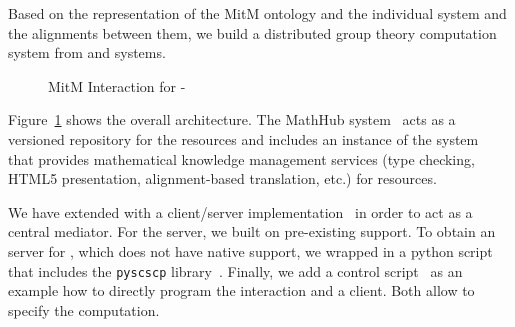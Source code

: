 Based on the \OMMT representation of the MitM ontology and the individual system and the alignments between them, we build a distributed group theory computation system from \GAP and \Singular systems.

\begin{figure}[ht]\centering
  \caption{MitM Interaction for \GAP-\Singular}\label{fig:mitmpoc}
\end{figure}

Figure~\ref{fig:mitmpoc} shows the overall architecture. The MathHub
system~\cite{MathHub:on} acts as a versioned repository for the \OMMT
resources and includes an instance of the \MMT system~\cite{Rabe:MAGMS13} that provides
mathematical knowledge management services (type checking, HTML5 presentation,
alignment-based translation, etc.) for \OMMT resources.

We have extended \MMT with a \SCSCP client/server implementation~\cite{twiesing:msc17} in order to act as a central mediator.
For the \GAP server, we built on pre-existing \SCSCP support.
To obtain an \SCSCP server for \Singular, which does not have native \SCSCP support, we wrapped \Singular in a python script that includes the \lstinline|pyscscp| library~\cite{py-scscp:on}.
Finally, we add a \Python control script~\cite{MitM-PoC} as an example how to directly program the interaction and a \Sage client.
Both allow to specify the computation.

